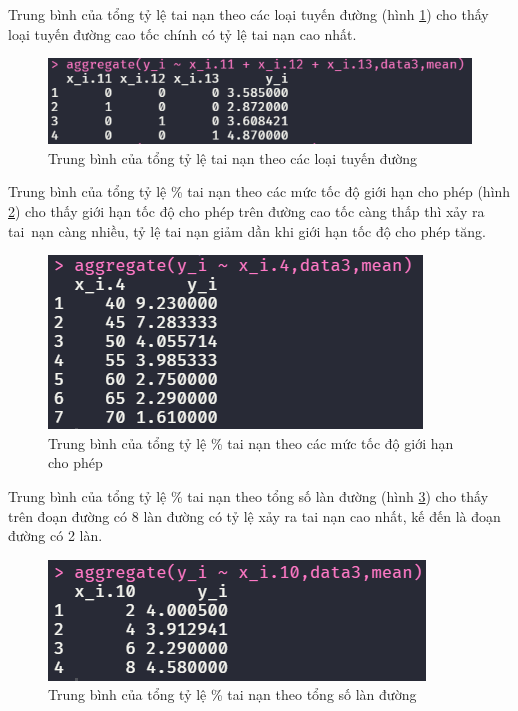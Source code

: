 Trung bình của tổng tỷ lệ tai nạn theo các loại tuyến đường (hình \ref{fig-b3:aggregate-x11-13}) cho thấy loại tuyến đường cao tốc chính có tỷ lệ tai nạn cao nhất.
\begin{figure}[H]
	\centering
	\includegraphics[width=0.7\linewidth]{images/B3/aggregate-x11-13}
	\caption{Trung bình của tổng tỷ lệ tai nạn theo các loại tuyến đường}
	\label{fig-b3:aggregate-x11-13}
\end{figure}

Trung bình của tổng tỷ lệ \% tai nạn theo các mức tốc độ giới hạn cho phép (hình \ref{fig-b3:aggregate-x4}) cho thấy giới hạn tốc độ cho phép trên đường cao tốc càng thấp thì xảy ra tai~nạn càng nhiều, tỷ lệ tai nạn giảm dần khi giới hạn tốc độ cho phép tăng.
\begin{figure}[H]
	\centering
	\includegraphics[width=0.45\linewidth]{images/B3/aggregate-x4}
	\caption{Trung bình của tổng tỷ lệ \% tai nạn theo các mức tốc độ giới hạn cho phép}
	\label{fig-b3:aggregate-x4}
\end{figure}

Trung bình của tổng tỷ lệ \% tai nạn theo tổng số làn đường (hình \ref{fig-b3:aggregate-x10}) cho thấy  trên đoạn đường có 8 làn đường có tỷ lệ xảy ra tai nạn cao nhất, kế đến là đoạn đường có 2 làn.
\begin{figure}[H]
	\centering
	\includegraphics[width=0.45\linewidth]{images/B3/aggregate-x10}
	\caption{Trung bình của tổng tỷ lệ \% tai nạn theo tổng số làn đường}
	\label{fig-b3:aggregate-x10}
\end{figure}

